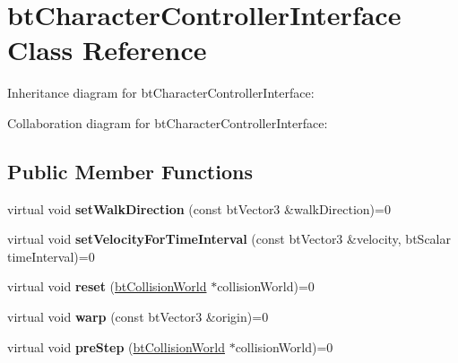 \hypertarget{classbt_character_controller_interface}{\section{bt\+Character\+Controller\+Interface Class Reference}
\label{classbt_character_controller_interface}
}


Inheritance diagram for bt\+Character\+Controller\+Interface\+:


Collaboration diagram for bt\+Character\+Controller\+Interface\+:
\subsection*{Public Member Functions}
\begin{DoxyCompactItemize}
\item 
\hypertarget{classbt_character_controller_interface_a2374fcc9c98fe90709ad9e5afb60d396}{virtual void {\bfseries set\+Walk\+Direction} (const bt\+Vector3 \&walk\+Direction)=0}\label{classbt_character_controller_interface_a2374fcc9c98fe90709ad9e5afb60d396}

\item 
\hypertarget{classbt_character_controller_interface_af54d6770114db0a54d4875bcc62bdf0b}{virtual void {\bfseries set\+Velocity\+For\+Time\+Interval} (const bt\+Vector3 \&velocity, bt\+Scalar time\+Interval)=0}\label{classbt_character_controller_interface_af54d6770114db0a54d4875bcc62bdf0b}

\item 
\hypertarget{classbt_character_controller_interface_a64b6d281a9c13e523632c808437fc4b2}{virtual void {\bfseries reset} (\hyperlink{classbt_collision_world}{bt\+Collision\+World} $\ast$collision\+World)=0}\label{classbt_character_controller_interface_a64b6d281a9c13e523632c808437fc4b2}

\item 
\hypertarget{classbt_character_controller_interface_ad62636f9204768ed9c3c9884605b4f52}{virtual void {\bfseries warp} (const bt\+Vector3 \&origin)=0}\label{classbt_character_controller_interface_ad62636f9204768ed9c3c9884605b4f52}

\item 
\hypertarget{classbt_character_controller_interface_add0f49483f16c91d5ff4426515a0ad9a}{virtual void {\bfseries pre\+Step} (\hyperlink{classbt_collision_world}{bt\+Collision\+World} $\ast$collision\+World)=0}\label{classbt_character_controller_interface_add0f49483f16c91d5ff4426515a0ad9a}


\end{DoxyCompactItemize}

